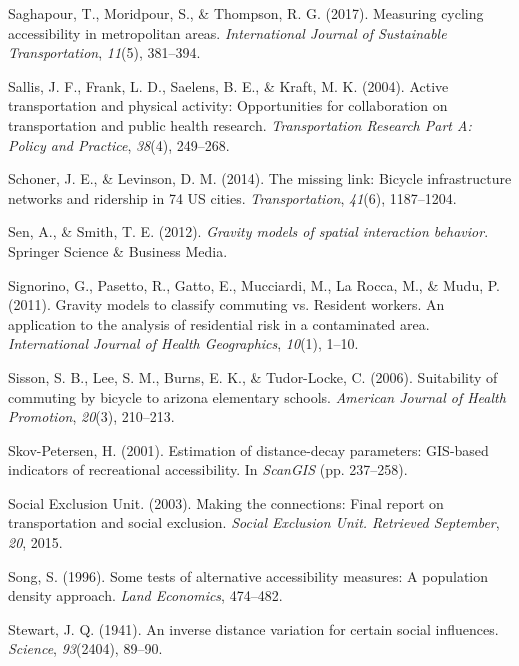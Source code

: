 \documentclass[
11pt, %
oneside, %
english, %
singlespacing, %
]{macthesis} %
\newlength{\cslhangindent}
\newenvironment{CSLReferences}[2] %
 {%
  \setlength{\parindent}{0pt}
  \ifodd #1 \everypar{\setlength{\hangindent}{\cslhangindent}}\ignorespaces\fi
  \ifnum #2 > 0
  \setlength{\parskip}{#2\baselineskip}
  \fi
 }%
 {}
\begin{document}
\begin{CSLReferences}{1}{0}
Saghapour, T., Moridpour, S., \& Thompson, R. G. (2017). Measuring cycling accessibility in metropolitan areas. \emph{International Journal of Sustainable Transportation}, \emph{11}(5), 381--394.

Sallis, J. F., Frank, L. D., Saelens, B. E., \& Kraft, M. K. (2004). Active transportation and physical activity: Opportunities for collaboration on transportation and public health research. \emph{Transportation Research Part A: Policy and Practice}, \emph{38}(4), 249--268.

Schoner, J. E., \& Levinson, D. M. (2014). The missing link: Bicycle infrastructure networks and ridership in 74 US cities. \emph{Transportation}, \emph{41}(6), 1187--1204.

Sen, A., \& Smith, T. E. (2012). \emph{Gravity models of spatial interaction behavior}. Springer Science \& Business Media.

Signorino, G., Pasetto, R., Gatto, E., Mucciardi, M., La Rocca, M., \& Mudu, P. (2011). Gravity models to classify commuting vs. Resident workers. An application to the analysis of residential risk in a contaminated area. \emph{International Journal of Health Geographics}, \emph{10}(1), 1--10.

Sisson, S. B., Lee, S. M., Burns, E. K., \& Tudor-Locke, C. (2006). Suitability of commuting by bicycle to arizona elementary schools. \emph{American Journal of Health Promotion}, \emph{20}(3), 210--213.

Skov-Petersen, H. (2001). Estimation of distance-decay parameters: GIS-based indicators of recreational accessibility. In \emph{ScanGIS} (pp. 237--258).

Social Exclusion Unit. (2003). Making the connections: Final report on transportation and social exclusion. \emph{Social Exclusion Unit. Retrieved September}, \emph{20}, 2015.

Song, S. (1996). Some tests of alternative accessibility measures: A population density approach. \emph{Land Economics}, 474--482.

Stewart, J. Q. (1941). An inverse distance variation for certain social influences. \emph{Science}, \emph{93}(2404), 89--90.


\end{CSLReferences}
\end{document}

